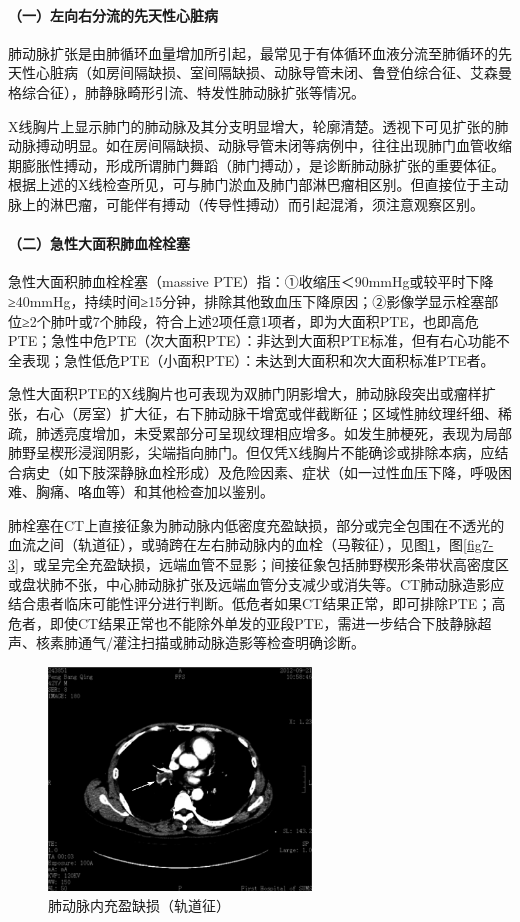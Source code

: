 \paragraph{（一）左向右分流的先天性心脏病}

肺动脉扩张是由肺循环血量增加所引起，最常见于有体循环血液分流至肺循环的先天性心脏病（如房间隔缺损、室间隔缺损、动脉导管未闭、鲁登伯综合征、艾森曼格综合征），肺静脉畸形引流、特发性肺动脉扩张等情况。

X线胸片上显示肺门的肺动脉及其分支明显增大，轮廓清楚。透视下可见扩张的肺动脉搏动明显。如在房间隔缺损、动脉导管未闭等病例中，往往出现肺门血管收缩期膨胀性搏动，形成所谓肺门舞蹈（肺门搏动），是诊断肺动脉扩张的重要体征。根据上述的X线检查所见，可与肺门淤血及肺门部淋巴瘤相区别。但直接位于主动脉上的淋巴瘤，可能伴有搏动（传导性搏动）而引起混淆，须注意观察区别。

\paragraph{（二）急性大面积肺血栓栓塞}

急性大面积肺血栓栓塞（massive
PTE）指：①收缩压＜90mmHg或较平时下降≥40mmHg，持续时间≥15分钟，排除其他致血压下降原因；②影像学显示栓塞部位≥2个肺叶或7个肺段，符合上述2项任意1项者，即为大面积PTE，也即高危PTE；急性中危PTE（次大面积PTE）：非达到大面积PTE标准，但有右心功能不全表现；急性低危PTE（小面积PTE）：未达到大面积和次大面积标准PTE者。

急性大面积PTE的X线胸片也可表现为双肺门阴影增大，肺动脉段突出或瘤样扩张，右心（房室）扩大征，右下肺动脉干增宽或伴截断征；区域性肺纹理纤细、稀疏，肺透亮度增加，未受累部分可呈现纹理相应增多。如发生肺梗死，表现为局部肺野呈楔形浸润阴影，尖端指向肺门。但仅凭X线胸片不能确诊或排除本病，应结合病史（如下肢深静脉血栓形成）及危险因素、症状（如一过性血压下降，呼吸困难、胸痛、咯血等）和其他检查加以鉴别。

肺栓塞在CT上直接征象为肺动脉内低密度充盈缺损，部分或完全包围在不透光的血流之间（轨道征），或骑跨在左右肺动脉内的血栓（马鞍征），见图\ref{fig7-2}，图\ref{fig7-3}，或呈完全充盈缺损，远端血管不显影；间接征象包括肺野楔形条带状高密度区或盘状肺不张，中心肺动脉扩张及远端血管分支减少或消失等。CT肺动脉造影应结合患者临床可能性评分进行判断。低危者如果CT结果正常，即可排除PTE；高危者，即使CT结果正常也不能除外单发的亚段PTE，需进一步结合下肢静脉超声、核素肺通气/灌注扫描或肺动脉造影等检查明确诊断。

\begin{figure}[!htbp]
 \centering
 \includegraphics[width=2.75in,height=2.33333in]{./images/Image00053.jpg}
 \captionsetup{justification=centering}
 \caption{肺动脉内充盈缺损（轨道征）}
 \label{fig7-2}
  \end{figure} 

